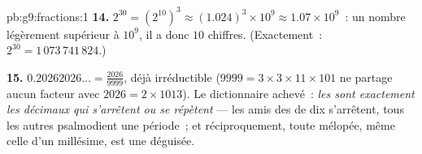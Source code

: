 \begin{solution}{pb:g9:fractions:1}
\textbf{14.} $2^{30} = \left(2^{10}\right)^3 \approx
(1.024)^3 \times 10^9 \approx 1.07 \times 10^9$~: un nombre
légèrement supérieur à $10^9$, il a donc $10$ chiffres.
(Exactement~: $2^{30} = 1\,073\,741\,824$.)

\textbf{15.} $0.20262026\ldots = \frac{2026}{9999}$, déjà
irréductible ($9999 = 3 \times 3 \times 11 \times 101$ ne partage
aucun facteur avec $2026 = 2 \times 1013$). Le dictionnaire
achevé~: \emph{les  sont exactement les décimaux qui
s'arrêtent ou se répètent} --- les  amis des 
de dix s'arrêtent, tous les autres psalmodient une période~; et
réciproquement, toute mélopée, même celle d'un millésime, est une
 déguisée.
\end{solution}
